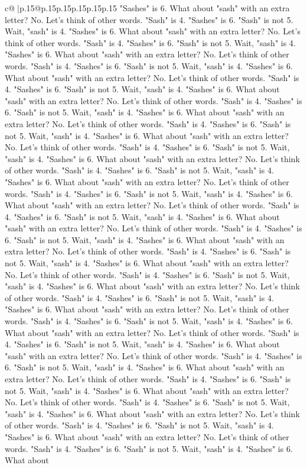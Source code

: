 \documentclass{article}
\begin{document}
{\begin{supertabular}{c@{$\;$}|p{.15\linewidth}@{}p{.15\linewidth}p{.15\linewidth}p{.15\linewidth}p{.15\linewidth}p{.15\linewidth}}
{{{"Sashes" is 6. What about "sash" with an extra letter? No. Let's think of other words. "Sash" is 4. "Sashes" is 6. "Sash" is not 5. Wait, "sash" is 4. "Sashes" is 6. What about "sash" with an extra letter? No. Let's think of other words. "Sash" is 4. "Sashes" is 6. "Sash" is not 5. Wait, "sash" is 4. "Sashes" is 6. What about "sash" with an extra letter? No. Let's think of other words. "Sash" is 4. "Sashes" is 6. "Sash" is not 5. Wait, "sash" is 4. "Sashes" is 6. What about "sash" with an extra letter? No. Let's think of other words. "Sash" is 4. "Sashes" is 6. "Sash" is not 5. Wait, "sash" is 4. "Sashes" is 6. What about "sash" with an extra letter? No. Let's think of other words. "Sash" is 4. "Sashes" is 6. "Sash" is not 5. Wait, "sash" is 4. "Sashes" is 6. What about "sash" with an extra letter? No. Let's think of other words. "Sash" is 4. "Sashes" is 6. "Sash" is not 5. Wait, "sash" is 4. "Sashes" is 6. What about "sash" with an extra letter? No. Let's think of other words. "Sash" is 4. "Sashes" is 6. "Sash" is not 5. Wait, "sash" is 4. "Sashes" is 6. What about "sash" with an extra letter? No. Let's think of other words. "Sash" is 4. "Sashes" is 6. "Sash" is not 5. Wait, "sash" is 4. "Sashes" is 6. What about "sash" with an extra letter? No. Let's think of other words. "Sash" is 4. "Sashes" is 6. "Sash" is not 5. Wait, "sash" is 4. "Sashes" is 6. What about "sash" with an extra letter? No. Let's think of other words. "Sash" is 4. "Sashes" is 6. "Sash" is not 5. Wait, "sash" is 4. "Sashes" is 6. What about "sash" with an extra letter? No. Let's think of other words. "Sash" is 4. "Sashes" is 6. "Sash" is not 5. Wait, "sash" is 4. "Sashes" is 6. What about "sash" with an extra letter? No. Let's think of other words. "Sash" is 4. "Sashes" is 6. "Sash" is not 5. Wait, "sash" is 4. "Sashes" is 6. What about "sash" with an extra letter? No. Let's think of other words. "Sash" is 4. "Sashes" is 6. "Sash" is not 5. Wait, "sash" is 4. "Sashes" is 6. What about "sash" with an extra letter? No. Let's think of other words. "Sash" is 4. "Sashes" is 6. "Sash" is not 5. Wait, "sash" is 4. "Sashes" is 6. What about "sash" with an extra letter? No. Let's think of other words. "Sash" is 4. "Sashes" is 6. "Sash" is not 5. Wait, "sash" is 4. "Sashes" is 6. What about "sash" with an extra letter? No. Let's think of other words. "Sash" is 4. "Sashes" is 6. "Sash" is not 5. Wait, "sash" is 4. "Sashes" is 6. What about "sash" with an extra letter? No. Let's think of other words. "Sash" is 4. "Sashes" is 6. "Sash" is not 5. Wait, "sash" is 4. "Sashes" is 6. What about "sash" with an extra letter? No. Let's think of other words. "Sash" is 4. "Sashes" is 6. "Sash" is not 5. Wait, "sash" is 4. "Sashes" is 6. What about "sash" with an extra letter? No. Let's think of other words. "Sash" is 4. "Sashes" is 6. "Sash" is not 5. Wait, "sash" is 4. "Sashes" is 6. What about "sash" with an extra letter? No. Let's think of other words. "Sash" is 4. "Sashes" is 6. "Sash" is not 5. Wait, "sash" is 4. "Sashes" is 6. What about "sash" with an extra letter? No. Let's think of other words. "Sash" is 4. "Sashes" is 6. "Sash" is not 5. Wait, "sash" is 4. "Sashes" is 6. What about }}}
\end{supertabular}}
\end{document}
